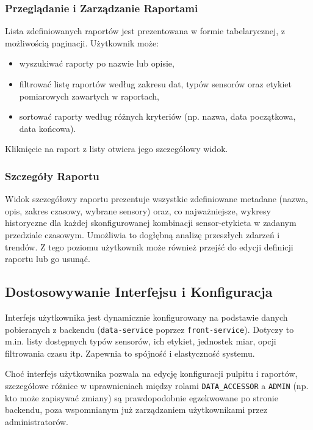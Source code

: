 \subsubsection{Przeglądanie i Zarządzanie Raportami}
Lista zdefiniowanych raportów jest prezentowana w formie tabelarycznej, z możliwością paginacji. Użytkownik może:
\begin{itemize}
    \item wyszukiwać raporty po nazwie lub opisie,
    \item filtrować listę raportów według zakresu dat, typów sensorów oraz etykiet pomiarowych zawartych w raportach,
    \item sortować raporty według różnych kryteriów (np. nazwa, data początkowa, data końcowa).
\end{itemize}
Kliknięcie na raport z listy otwiera jego szczegółowy widok.

\subsubsection{Szczegóły Raportu}
Widok szczegółowy raportu prezentuje wszystkie zdefiniowane metadane (nazwa, opis, zakres czasowy, wybrane sensory) oraz, co najważniejsze, wykresy historyczne dla każdej skonfigurowanej kombinacji sensor-etykieta w zadanym przedziale czasowym. Umożliwia to dogłębną analizę przeszłych zdarzeń i trendów. Z tego poziomu użytkownik może również przejść do edycji definicji raportu lub go usunąć.

\subsection{Dostosowywanie Interfejsu i Konfiguracja}
Interfejs użytkownika jest dynamicznie konfigurowany na podstawie danych pobieranych z backendu (\texttt{data-service} poprzez \texttt{front-service}). Dotyczy to m.in. listy dostępnych typów sensorów, ich etykiet, jednostek miar, opcji filtrowania czasu itp. Zapewnia to spójność i elastyczność systemu.

Choć interfejs użytkownika pozwala na edycję konfiguracji pulpitu i raportów, szczegółowe różnice w uprawnieniach między rolami \texttt{DATA\_ACCESSOR} a \texttt{ADMIN} (np. kto może zapisywać zmiany) są prawdopodobnie egzekwowane po stronie backendu, poza wspomnianym już zarządzaniem użytkownikami przez administratorów. 